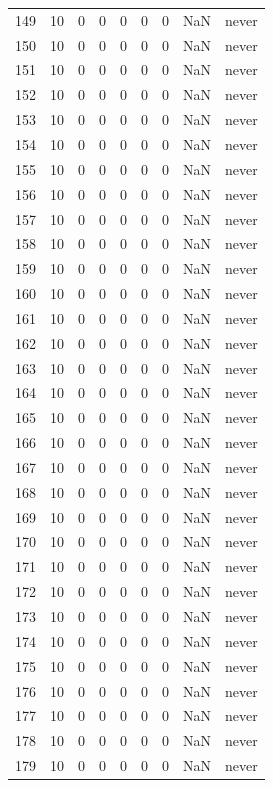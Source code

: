 \begin{longtable}{rrrrrrrrl}
149 & 10 & 0 & 0 & 0 & 0 & 0 & NaN & never \\
150 & 10 & 0 & 0 & 0 & 0 & 0 & NaN & never \\
151 & 10 & 0 & 0 & 0 & 0 & 0 & NaN & never \\
152 & 10 & 0 & 0 & 0 & 0 & 0 & NaN & never \\
153 & 10 & 0 & 0 & 0 & 0 & 0 & NaN & never \\
154 & 10 & 0 & 0 & 0 & 0 & 0 & NaN & never \\
155 & 10 & 0 & 0 & 0 & 0 & 0 & NaN & never \\
156 & 10 & 0 & 0 & 0 & 0 & 0 & NaN & never \\
157 & 10 & 0 & 0 & 0 & 0 & 0 & NaN & never \\
158 & 10 & 0 & 0 & 0 & 0 & 0 & NaN & never \\
159 & 10 & 0 & 0 & 0 & 0 & 0 & NaN & never \\
160 & 10 & 0 & 0 & 0 & 0 & 0 & NaN & never \\
161 & 10 & 0 & 0 & 0 & 0 & 0 & NaN & never \\
162 & 10 & 0 & 0 & 0 & 0 & 0 & NaN & never \\
163 & 10 & 0 & 0 & 0 & 0 & 0 & NaN & never \\
164 & 10 & 0 & 0 & 0 & 0 & 0 & NaN & never \\
165 & 10 & 0 & 0 & 0 & 0 & 0 & NaN & never \\
166 & 10 & 0 & 0 & 0 & 0 & 0 & NaN & never \\
167 & 10 & 0 & 0 & 0 & 0 & 0 & NaN & never \\
168 & 10 & 0 & 0 & 0 & 0 & 0 & NaN & never \\
169 & 10 & 0 & 0 & 0 & 0 & 0 & NaN & never \\
170 & 10 & 0 & 0 & 0 & 0 & 0 & NaN & never \\
171 & 10 & 0 & 0 & 0 & 0 & 0 & NaN & never \\
172 & 10 & 0 & 0 & 0 & 0 & 0 & NaN & never \\
173 & 10 & 0 & 0 & 0 & 0 & 0 & NaN & never \\
174 & 10 & 0 & 0 & 0 & 0 & 0 & NaN & never \\
175 & 10 & 0 & 0 & 0 & 0 & 0 & NaN & never \\
176 & 10 & 0 & 0 & 0 & 0 & 0 & NaN & never \\
177 & 10 & 0 & 0 & 0 & 0 & 0 & NaN & never \\
178 & 10 & 0 & 0 & 0 & 0 & 0 & NaN & never \\
179 & 10 & 0 & 0 & 0 & 0 & 0 & NaN & never \\

\end{longtable}
